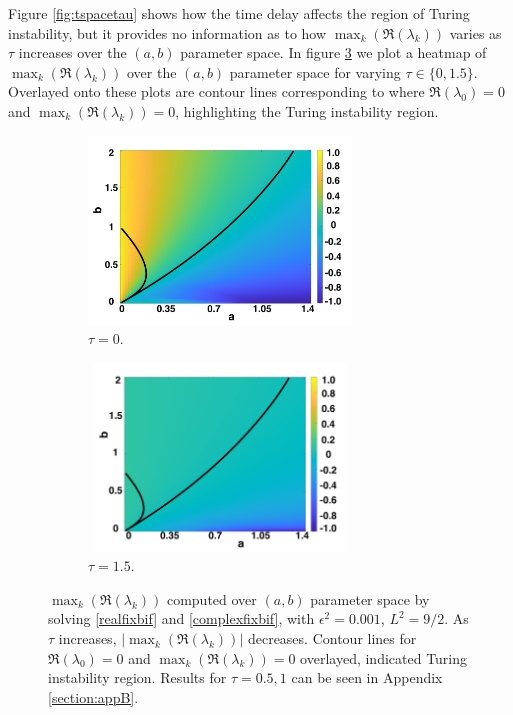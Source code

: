 Figure \ref{fig:tspacetau} shows how the time delay affects the region of Turing instability, but it provides no information as to how $\max_k(\Re(\lambda_k))$ varies as $\tau$ increases over the $(a,b)$ parameter space. In figure \ref{fig:lambdavary} we plot a heatmap of $\max_k(\Re(\lambda_k))$ over the $(a,b)$ parameter space for varying $\tau\in\{0,1.5\}$. Overlayed onto these plots are contour lines corresponding to where $\Re(\lambda_0)=0$ and $\max_k(\Re(\lambda_k))=0$,
highlighting the Turing instability region.
\begin{figure}[H]
    \centering
    \begin{subfigure}[t]{0.45\textwidth}
        \centering
        \includegraphics[width=7cm,height=5cm]{tau0bif.png}
        \caption{$\tau=0$.}
        \label{}
    \end{subfigure}
    \hfill
    \begin{subfigure}[t]{0.45\textwidth}
        \centering
        \includegraphics[width=7cm,height=5cm]{tau15bif.png}
        \caption{$\tau=1.5$.}
        \label{}
    \end{subfigure}
    \caption{$\max_k(\Re(\lambda_k))$ computed over $(a,b)$ parameter space by solving \eqref{realfixbif} and \eqref{complexfixbif}, with $\epsilon^2=0.001$, $L^2=9/2$. As $\tau$ increases, $|\max_k(\Re(\lambda_k))|$ decreases. Contour lines for $\Re(\lambda_0)=0$ and $\max_k(\Re(\lambda_k))=0$ overlayed, indicated Turing instability region. Results for $\tau=0.5,1$ can be seen in Appendix \ref{section:appB}.}
    \label{fig:lambdavary}
\end{figure}
